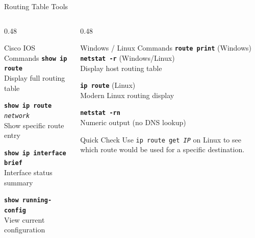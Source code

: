 \documentclass[aspectratio=169]{beamer}  %
\begin{document}
\begin{frame}{Routing Table Tools}
    \begin{columns}[T]
        \begin{column}{0.48\textwidth}
            \begin{block}{Cisco IOS Commands}
                \small
                \texttt{\textbf{show ip route}} \\
                Display full routing table
                
                \vspace{0.2em}
                \texttt{\textbf{show ip route} \textit{network}} \\
                Show specific route entry
                
                \vspace{0.2em}
                \texttt{\textbf{show ip interface brief}} \\
                Interface status summary
                
                \vspace{0.2em}
                \texttt{\textbf{show running-config}} \\
                View current configuration
            \end{block}
        \end{column}
        \begin{column}{0.48\textwidth}
            \begin{block}{Windows / Linux Commands}
                \small
                \texttt{\textbf{route print}} (Windows) \\
                \texttt{\textbf{netstat -r}} (Windows/Linux) \\
                Display host routing table
                
                \vspace{0.2em}
                \texttt{\textbf{ip route}} (Linux) \\
                Modern Linux routing display
                
                \vspace{0.2em}
                \texttt{\textbf{netstat -rn}} \\
                Numeric output (no DNS lookup)
            \end{block}
            
            \vspace{0.2em}
            \begin{exampleblock}{Quick Check}
                \small
                Use \texttt{ip route get \textit{IP}} on Linux to see which route would be used for a specific destination.
            \end{exampleblock}
        \end{column}
    \end{columns}
\end{frame}
\end{document}
